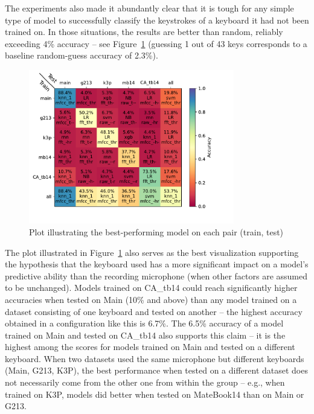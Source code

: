 \documentclass[../main.tex]{subfiles}
\begin{document}
The experiments also made it abundantly clear that it is tough for any simple type of model to successfully classify the keystrokes of a keyboard it had not been trained on. 
In those situations, the results are better than random, reliably exceeding 4\% accuracy -- see Figure~\ref{fig:best_model_per_train_test} (guessing 1 out of 43 keys corresponds to a baseline random-guess accuracy of 2.3\%). 

\begin{figure}[H]
    \centering
    \includegraphics[width=0.8\textwidth]{figures/plots/best_models_per_train_test.pdf}
    \caption{Plot illustrating the best-performing model on each pair (train, test)}
    \label{fig:best_model_per_train_test}
\end{figure}

The plot illustrated in Figure~\ref{fig:best_model_per_train_test} also serves as the best visualization supporting the hypothesis that the keyboard used has a more significant impact on a model's predictive ability than the recording microphone (when other factors are assumed to be unchanged).
Models trained on CA\_tb14 could reach significantly higher accuracies when tested on Main (10\% and above) than any model trained on a dataset consisting of one keyboard and tested on another -- the highest accuracy obtained in a configuration like this is 6.7\%. 
The 6.5\% accuracy of a model trained on Main and tested on CA\_tb14 also supports this claim -- it is the highest among the scores for models trained on Main and tested on a different keyboard.
When two datasets used the same microphone but different keyboards (Main, G213, K3P), the best performance when tested on a different dataset does not necessarily come from the other one from within the group -- e.g., when trained on K3P, models did better when tested on MateBook14 than on Main or G213.
\end{document}
